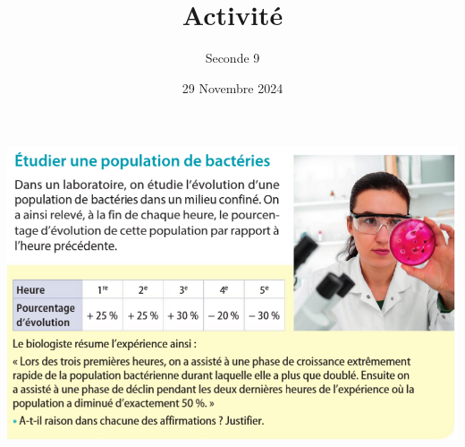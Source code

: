 \documentclass{article}
\title{Activité}
\date{29 Novembre 2024}
\author{Seconde 9}
\begin{document}
\maketitle

\begin{center}
\includegraphics[width=\textwidth]{Activite_evolutions_successives.png}
\end{center}
\end{document}
